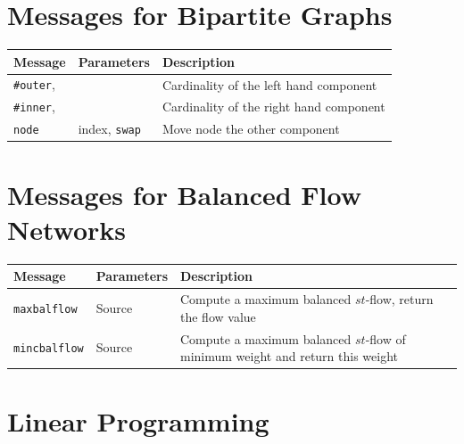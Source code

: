 \documentclass[a4paper,11pt,twoside]{book}
\begin{document}
\section{Messages for Bipartite Graphs}
\label{slb_bipartite_messages}
\medskip
\begin{center}
\begin{tabular}{|p{3cm}|p{8cm}|p{12.5cm}|}
\hline
{\bf Message}       & {\bf Parameters} & {\bf Description} \\
\hline
\hline
\verb/#outer/,      & & Cardinality of the left hand component\\
\hline
\verb/#inner/,      & & Cardinality of the right hand component \\
\hline
\verb/node/ & index, \verb/swap/ & Move node the other component \\
\hline
\end{tabular}
\end{center}


\section{Messages for Balanced Flow Networks}
\label{slb_balanced_messages}
\medskip
\begin{center}
\begin{tabular}{|p{3cm}|p{8cm}|p{12.5cm}|}
\hline
{\bf Message}       & {\bf Parameters} & {\bf Description} \\
\hline
\hline
\verb/maxbalflow/      & Source
                    & Compute a maximum balanced $st$-flow, return the flow value \\
\hline
\verb/mincbalflow/     & Source
                    & Compute a maximum balanced $st$-flow of minimum weight and return this weight \\
\hline
\end{tabular}
\end{center}


\newpage
{}
\section{Linear Programming}
\end{document}
